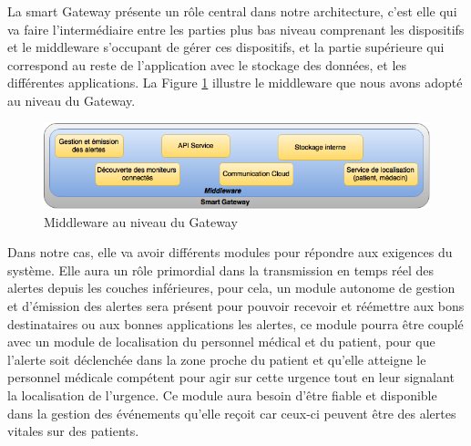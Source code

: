 La smart Gateway présente un rôle central dans notre architecture, c’est elle qui va faire l’intermédiaire entre les parties plus bas niveau comprenant les dispositifs et le middleware s’occupant de gérer ces dispositifs, et la partie supérieure qui correspond au reste de l’application avec le stockage des données, et les différentes applications. La Figure \ref{gateway} illustre le middleware que nous avons adopté au niveau du Gateway.
\newline
\begin{figure}[h!]
	\hspace*{-3cm}
	\centering
	\includegraphics[width=1.5\textwidth]{Figure6.png}
	\caption{Middleware au niveau du Gateway}
	\label{gateway}
\end{figure}

Dans notre cas, elle va avoir différents modules pour répondre aux exigences du système. Elle aura un rôle primordial dans la transmission en temps réel des alertes depuis les couches inférieures, pour cela, un module autonome de gestion et d’émission des alertes sera présent pour pouvoir recevoir et réémettre aux bons destinataires ou aux bonnes applications les alertes, ce module pourra être couplé avec un module de localisation du personnel médical et du patient, pour que l’alerte soit déclenchée dans la zone proche du patient et qu’elle atteigne le personnel médicale compétent pour agir sur cette urgence tout en leur signalant la localisation de l’urgence. Ce module aura besoin d’être fiable et disponible dans la gestion des événements qu’elle reçoit car ceux-ci peuvent être des alertes vitales sur des patients.

